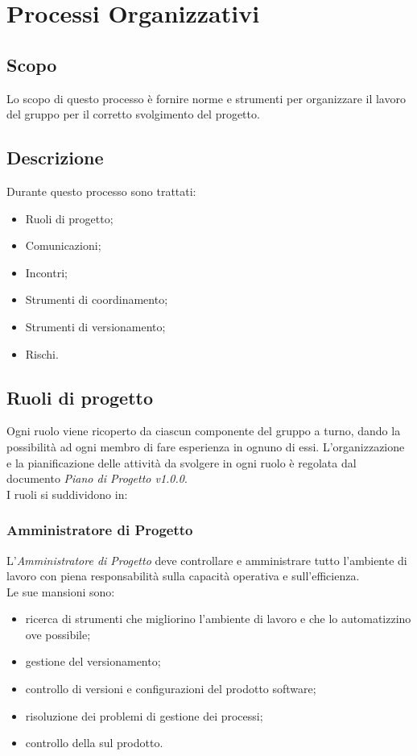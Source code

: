 \documentclass[./../NomeDocumento.tex]{subfiles}
\begin{document}
	
	\chapter{Processi Organizzativi}
	
	\section{Scopo}
	Lo scopo di questo processo è fornire norme e strumenti per organizzare il lavoro del gruppo per il corretto svolgimento del progetto.
	
	\section {Descrizione}
	Durante questo processo sono trattati:
	\begin{itemize}
		\item Ruoli di progetto;
		\item Comunicazioni;
		\item Incontri;
		\item Strumenti di coordinamento;
		\item Strumenti di versionamento;
		\item Rischi.
		
	\end{itemize}
	
	\section {Ruoli di progetto}
	
	Ogni ruolo viene ricoperto da ciascun componente del gruppo a turno, dando la possibilità ad ogni membro di fare esperienza in ognuno di essi. L'organizzazione e la pianificazione delle attività da svolgere in ogni ruolo è regolata dal documento \textit{Piano di Progetto v1.0.0}.
	\\ \noindent I ruoli si suddividono in:
	
	\subsection {Amministratore di Progetto}
	
	L’\textit{Amministratore di Progetto} deve controllare e amministrare tutto l’ambiente di lavoro con piena responsabilità sulla capacità operativa e sull’efficienza. 
	\\ \noindent Le sue mansioni sono: 
	
	\begin{itemize}
		\item ricerca di strumenti che migliorino l’ambiente di lavoro e che lo automatizzino ove possibile;
		\item gestione del versionamento;
		\item controllo di versioni e configurazioni del prodotto software; 
		\item risoluzione dei problemi di gestione dei processi; 
		\item controllo della  sul prodotto.
	\end{itemize}
	
\end{document}
